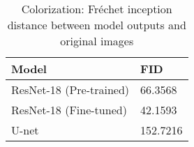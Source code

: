 \begin{table}[!htb]
\centering
\setlength{\tabcolsep}{12pt} %
\renewcommand{\arraystretch}{0.8} %
\begin{tabular}{p{} | p{} }
        \hline
        \hline
        \centering\footnotesize{\textbf{Model}} & \footnotesize{\textbf{FID}}\\
        \hline
        \footnotesize{ResNet-18 (Pre-trained)} & \footnotesize{66.3568}\\
        \footnotesize{ResNet-18 (Fine-tuned)} & \footnotesize{42.1593}\\
        \footnotesize{U-net} & \footnotesize{152.7216}\\
        \hline
    \end{tabular}
\caption{Colorization: Fréchet inception distance between model outputs and original images}
\label{tab:colorization_FID}
\end{table}